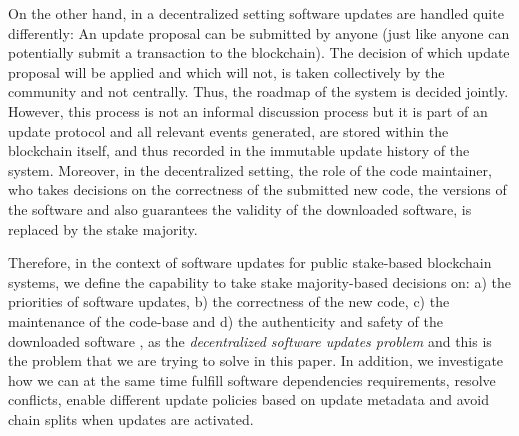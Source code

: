 On the other hand, in a decentralized setting software updates are handled quite differently: An update proposal can be submitted by anyone (just like anyone can potentially submit a transaction to the blockchain). The decision of which update proposal will be applied and which will not, is taken collectively by the community and not centrally. Thus, the roadmap of the system is decided jointly. However, this process is not an informal discussion process but it is part of an update protocol and all relevant events generated, are stored within the blockchain itself, and thus recorded in the immutable update history of the system. Moreover, in the decentralized setting, the role of the code maintainer, who takes decisions on the correctness of the submitted new code, the versions of the software and also guarantees the validity of the downloaded software, is replaced by the stake majority. 

Therefore, in the context of software updates for public stake-based blockchain systems, we define the capability to take stake majority-based decisions on: a) the priorities of software updates, b) the correctness of the new code, c) the maintenance of the code-base and d) the authenticity and safety of the downloaded software
, as the \emph{decentralized software updates problem} and this is the problem that we are trying to solve in this paper. In addition, we investigate how we can at the same time fulfill software dependencies requirements, resolve conflicts, enable different update policies based on update metadata and avoid chain splits when updates are activated.

